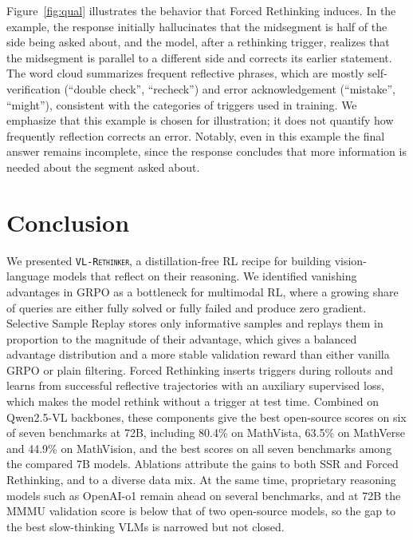 \documentclass{article}
\newcommand{\model}{\texttt{\textsc{VL-Rethinker}}\xspace}
\begin{document}
Figure~\ref{fig:qual} illustrates the behavior that Forced Rethinking induces. In the example, the response initially hallucinates that the midsegment is half of the side being asked about, and the model, after a rethinking trigger, realizes that the midsegment is parallel to a different side and corrects its earlier statement. The word cloud summarizes frequent reflective phrases, which are mostly self-verification (``double check'', ``recheck'') and error acknowledgement (``mistake'', ``might''), consistent with the categories of triggers used in training. We emphasize that this example is chosen for illustration; it does not quantify how frequently reflection corrects an error. Notably, even in this example the final answer remains incomplete, since the response concludes that more information is needed about the segment asked about.

\section{Conclusion}

We presented \model, a distillation-free RL recipe for building vision-language models that reflect on their reasoning. We identified vanishing advantages in GRPO as a bottleneck for multimodal RL, where a growing share of queries are either fully solved or fully failed and produce zero gradient. Selective Sample Replay stores only informative samples and replays them in proportion to the magnitude of their advantage, which gives a balanced advantage distribution and a more stable validation reward than either vanilla GRPO or plain filtering. Forced Rethinking inserts triggers during rollouts and learns from successful reflective trajectories with an auxiliary supervised loss, which makes the model rethink without a trigger at test time. Combined on Qwen2.5-VL backbones, these components give the best open-source scores on six of seven benchmarks at 72B, including 80.4\% on MathVista, 63.5\% on MathVerse and 44.9\% on MathVision, and the best scores on all seven benchmarks among the compared 7B models. Ablations attribute the gains to both SSR and Forced Rethinking, and to a diverse data mix. At the same time, proprietary reasoning models such as OpenAI-o1 remain ahead on several benchmarks, and at 72B the MMMU validation score is below that of two open-source models, so the gap to the best slow-thinking VLMs is narrowed but not closed.




\end{document}
